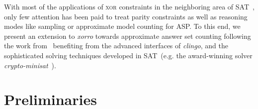 \documentclass{article}
\newcommand{\XOR}{\textsc{xor}} %
\newcommand{\sysfont}{\textit}
\newcommand{\clingo}{\sysfont{clingo}}
\newcommand{\xorro}{\sysfont{xorro}}
\newcommand{\cryptominisat}{\sysfont{crypto-minisat}}
\begin{document}
%
With most of the applications of \XOR{} constraints in the neighboring area of SAT~\cite{DBLP:journals/corr/abs-1806-02239},
only few attention has been paid to treat parity constraints as well as reasoning modes like sampling or approximate model counting for ASP. %
%
To this end, we present an extension to \xorro{} towards approximate answer set counting following the work from~\cite{DBLP:conf/cp/ChakrabortyMV13}
benefiting from the advanced interfaces of \clingo{},
and the sophisticated solving techniques developed in SAT~(e.g. the award-winning solver \cryptominisat~\cite{DBLP:conf/sat/SoosNC09}).
%

\section{Preliminaries}
\end{document}
